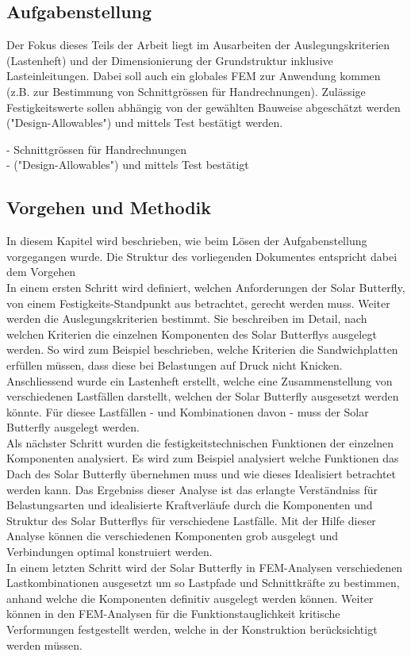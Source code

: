 \subsection{Aufgabenstellung}
Der Fokus dieses Teils der Arbeit liegt im Ausarbeiten der Auslegungskriterien (Lastenheft) und der Dimensionierung der Grundstruktur inklusive Lasteinleitungen.
Dabei soll auch ein globales FEM zur Anwendung kommen (z.B. zur Bestimmung von Schnittgrössen für Handrechnungen).
Zulässige Festigkeitswerte sollen abhängig von der gewählten Bauweise abgeschätzt werden ("Design-Allowables") und mittels Test bestätigt werden.

  - Schnittgrössen für Handrechnungen\\
  - ("Design-Allowables") und mittels Test bestätigt

\subsection{Vorgehen und Methodik}
In diesem Kapitel wird beschrieben, wie beim Lösen der Aufgabenstellung vorgegangen wurde. Die Struktur des vorliegenden Dokumentes entspricht dabei dem Vorgehen\\

In einem ersten Schritt wird definiert, welchen Anforderungen der Solar Butterfly, von einem Festigkeits-Standpunkt aus betrachtet, gerecht werden muss. Weiter werden die Auslegungskriterien bestimmt. Sie beschreiben im Detail, nach welchen Kriterien die einzelnen Komponenten des Solar Butterflys ausgelegt werden. So wird zum Beispiel beschrieben, welche Kriterien die Sandwichplatten erfüllen müssen, dass diese bei Belastungen auf Druck nicht Knicken.\\
Anschliessend wurde ein Lastenheft erstellt, welche eine Zusammenstellung von verschiedenen Lastfällen darstellt, welchen der Solar Butterfly ausgesetzt werden könnte. Für diesee Lastfällen - und Kombinationen davon - muss der Solar Butterfly ausgelegt werden.\\
Als nächster Schritt wurden die festigkeitstechnischen Funktionen der einzelnen Komponenten analysiert. Es wird zum Beispiel analysiert welche Funktionen das Dach des Solar Butterfly übernehmen muss und wie dieses Idealisiert betrachtet werden kann. Das Ergebniss dieser Analyse ist das erlangte Verständniss für Belastungsarten und idealisierte Kraftverläufe durch die Komponenten und Struktur des Solar Butterflys für verschiedene Lastfälle. Mit der Hilfe dieser Analyse können die verschiedenen Komponenten grob ausgelegt und Verbindungen optimal konstruiert werden.\\
In einem letzten Schritt wird der Solar Butterfly in FEM-Analysen verschiedenen Lastkombinationen ausgesetzt um so Lastpfade und Schnittkräfte zu bestimmen, anhand welche die Komponenten definitiv ausgelegt werden können. Weiter können in den FEM-Analysen für die Funktionstauglichkeit kritische Verformungen festgestellt werden, welche in der Konstruktion berücksichtigt werden müssen.


